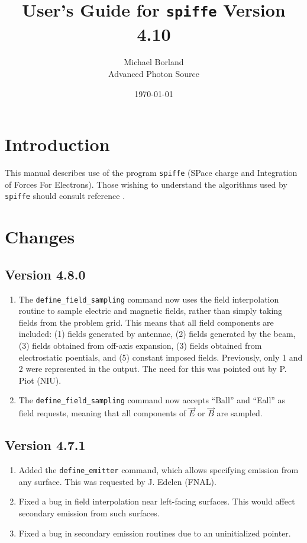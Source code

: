 \documentclass[11pt]{article}
\begin{document}
\title{User's Guide for {\tt spiffe} Version 4.10}
\author{Michael Borland\\Advanced Photon Source\\ \date{\today}}
\maketitle

\section{Introduction}

This manual describes use of the program {\tt spiffe} (SPace charge and
Integration of Forces For Electrons).  Those wishing to understand the
algorithms used by {\tt spiffe} should consult reference \cite{spiffeEqn}.

\section{Changes}
\subsection{Version 4.8.0}

\begin{enumerate}
\item The \verb|define_field_sampling| command now uses the field interpolation routine to sample
  electric and magnetic fields, rather than simply taking fields from the problem grid. This means that
  all field components are included: (1) fields generated by antennae, (2) fields generated by the beam,
  (3) fields obtained from off-axis expansion, (3) fields obtained from electrostatic poentials, and (5) constant
  imposed fields. Previously, only 1 and 2 were represented in the output.
  The need for this was pointed out by P. Piot (NIU).
\item The \verb|define_field_sampling| command now accepts ``Ball'' and ``Eall'' as field requests, meaning
  that all components of $\vec{E}$ or $\vec{B}$ are sampled.
\end{enumerate}


\subsection{Version 4.7.1}
\begin{enumerate}
\item Added the \verb|define_emitter| command, which allows specifying emission from any
  surface. This was requested by J. Edelen (FNAL).
\item Fixed a bug in field interpolation near left-facing surfaces. This would affect secondary emission from such surfaces.
\item Fixed a bug in secondary emission routines due to an uninitialized pointer.
\end{enumerate}
\end{document}
